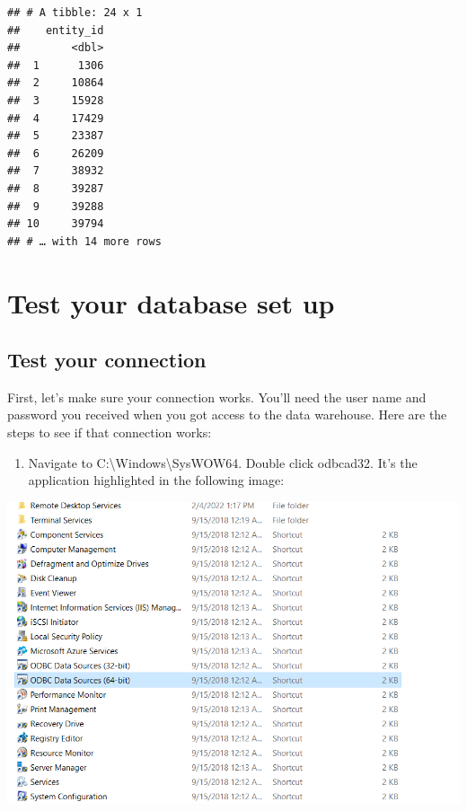 \documentclass[]{book}
\providecommand{\tightlist}{%
  \setlength{\itemsep}{0pt}\setlength{\parskip}{0pt}}
\begin{document}
\begin{verbatim}
## # A tibble: 24 x 1
##    entity_id
##        <dbl>
##  1      1306
##  2     10864
##  3     15928
##  4     17429
##  5     23387
##  6     26209
##  7     38932
##  8     39287
##  9     39288
## 10     39794
## # … with 14 more rows
\end{verbatim}

\hypertarget{appendix-appendix}{%
\appendix}


\hypertarget{test-cdw}{%
\chapter{Test your database set up}\label{test-cdw}}

\hypertarget{test-your-connection}{%
\section{Test your connection}\label{test-your-connection}}

First, let's make sure your connection works. You'll need the user name and password you received when you got access to the data warehouse. Here are the steps to see if that connection works:

\begin{enumerate}
\def\labelenumi{\arabic{enumi})}
\tightlist
\item
  Navigate to C:\textbackslash Windows\textbackslash SysWOW64. Double click odbcad32. It's the application highlighted in the following image:
\end{enumerate}

\includegraphics[width=15.67in]{images/syswow64}
\end{document}
